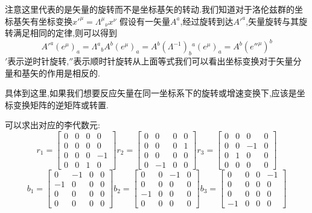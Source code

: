 \documentclass[../main.tex]{subfiles}
\begin{document}
     \begin{note}
     注意这里代表的是矢量的旋转而不是坐标基矢的转动.我们知道对于洛伦兹群的坐标基矢有坐标变换$x'^\mu = \Lambda^\mu{}_\nu x^\nu$
     假设有一矢量$A^a$,经过旋转到达$A'^a$,矢量旋转与其旋转满足相同的定律,则可以得到
    $$A'^a(e^\mu)_a = \Lambda^a{}_b A^b(e^\mu)_a= A^b(\Lambda^{-1})_b{}^a(e^\mu)_a= A^b(e''^\mu)^b$$
    $'$表示逆时针旋转,$''$表示顺时针旋转从上面等式我们可以看出坐标变换对于矢量分量和基矢的作用是相反的.

    具体到这里,如果我们想要反应矢量在同一坐标系下的旋转或增速变换下,应该是坐标变换矩阵的逆矩阵或转置.
     \end{note}
     可以求出对应的李代数元:
     $$r_1=\begin{bmatrix}
     0 & 0 & 0 & 0 \\
     0 & 0 & 0 & 0 \\
     0 & 0 & 0 & -1 \\
     0 & 0 & 1 & 0
     \end{bmatrix}
     r_2=\begin{bmatrix}
     0 & 0 & 0 & 0 \\
     0 & 0 & 0 & 1\\
     0 & 0 & 0 & 0 \\
     0 & -1 & 0 & 0
     \end{bmatrix}
     r_3=\begin{bmatrix}
     0 & 0 & 0 & 0 \\
     0 & 0 & -1 & 0 \\
     0 & 1 & 0 & 0 \\
     0 & 0 & 0 & 0
     \end{bmatrix}$$
     $$b_1=\begin{bmatrix}
     0 & -1& 0 & 0 \\
     -1  & 0  & 0 & 0 \\
     0 & 0 & 0 & 0 \\
     0 & 0 & 0 & 0
     \end{bmatrix}
     b_2=\begin{bmatrix}
     0  & 0 & -1  & 0 \\
     0 & 0 & 0 & 0 \\
     -1  & 0 & 0  & 0 \\
     0 & 0 & 0 & 0
     \end{bmatrix}
     b_3=\begin{bmatrix}
     0  & 0 & 0 & -1  \\
     0 & 0 & 0 & 0 \\
     0 & 0 & 0 & 0 \\
     -1  & 0 & 0 & 0 
     \end{bmatrix}$$
\end{document}
